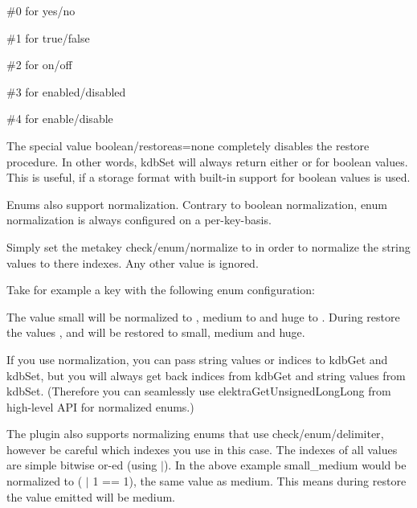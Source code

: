 \begin{DoxyItemize}
\item {\ttfamily \#0} for {\ttfamily yes}/{\ttfamily no}
\item {\ttfamily \#1} for {\ttfamily true}/{\ttfamily false}
\item {\ttfamily \#2} for {\ttfamily on}/{\ttfamily off}
\item {\ttfamily \#3} for {\ttfamily enabled}/{\ttfamily disabled}
\item {\ttfamily \#4} for {\ttfamily enable}/{\ttfamily disable}
\end{DoxyItemize}

The special value {\ttfamily boolean/restoreas=none} completely disables the restore procedure. In other words, {\ttfamily kdb\+Set} will always return either {} or {} for boolean values. This is useful, if a storage format with built-\/in support for boolean values is used.

Enums also support normalization. Contrary to boolean normalization, enum normalization is always configured on a per-\/key-\/basis.

Simply set the metakey {\ttfamily check/enum/normalize} to {} in order to normalize the string values to there indexes. Any other value is ignored.

Take for example a key with the following enum configuration\+:




The value {\ttfamily small} will be normalized to {}, {\ttfamily medium} to {} and {\ttfamily huge} to {}. During restore the values {}, {} and {} will be restored to {\ttfamily small}, {\ttfamily medium} and {\ttfamily huge}.

If you use normalization, you can pass string values or indices to {\ttfamily kdb\+Get} and {\ttfamily kdb\+Set}, but you will always get back indices from {\ttfamily kdb\+Get} and string values from {\ttfamily kdb\+Set}. (Therefore you can seamlessly use {\ttfamily elektra\+Get\+Unsigned\+Long\+Long} from high-\/level A\+PI for normalized enums.)

The plugin also supports normalizing enums that use {\ttfamily check/enum/delimiter}, however be careful which indexes you use in this case. The indexes of all values are simple bitwise or-\/ed (using {\ttfamily $\vert$}). In the above example {\ttfamily small\+\_\+medium} would be normalized to {} ({ $\vert$ 1 == 1}), the same value as {\ttfamily medium}. This means during restore the value emitted will be {\ttfamily medium}.

